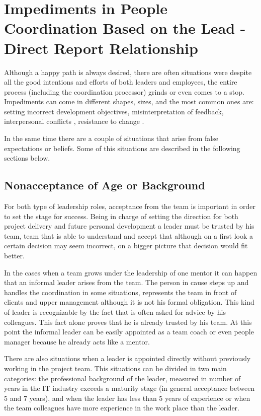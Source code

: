 \chapter{Impediments in People Coordination Based on the Lead - Direct Report Relationship}
\label{chapter:impediments}

Although a happy path is always desired, there are often situations were despite all the good intentions and efforts of both leaders and employees, the entire process (including the coordination processor) grinds or even comes to a stop. Impediments can come in different shapes, sizes, and the most common ones are: setting incorrect development objectives, misinterpretation of feedback, interpersonal conflicts \cite{abur-pm}, resistance to change \cite{abur-tl}. 

In the same time there are a couple of situations that arise from false expectations or beliefs. Some of this situations are described in the following sections below.

\section{Nonacceptance of Age or Background}
\label{sec:unnaceptance}
For both type of leadership roles, acceptance from the team is important in order to set the stage for success. Being in charge of setting the direction for both project delivery and future personal development a leader must be trusted by his team, team that is able to understand and accept that although on a first look a certain decision may seem incorrect, on a bigger picture that decision would fit better. 

In the cases when a team grows under the leadership of one mentor it can happen that an informal leader arises from the team. The person in cause steps up and handles the coordination in some situations, represents the team in front of clients and upper management although it is not his formal obligation. This kind of leader is recognizable by the fact that is often asked for advice by his colleagues. This fact alone proves that he is already trusted by his team. At this point the informal leader can be easily appointed as a team coach or even people manager because he already acts like a mentor.

There are also situations when a leader is appointed directly without previously working in the project team. This situations can be divided in two main categories: the professional background of the leader, measured in number of years in the IT industry exceeds a maturity stage (in general acceptance between 5 and 7 years), and when the leader has less than 5 years of experience or when the team colleagues have more experience in the work place than the leader.

